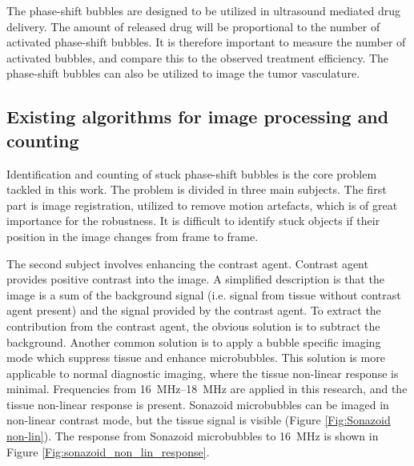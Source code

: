 The phase-shift bubbles are designed to be utilized in ultrasound mediated drug delivery. The amount of released drug will be proportional to the number of activated phase-shift bubbles. It is therefore important to measure the number of activated bubbles, and compare this to the observed treatment efficiency. The phase-shift bubbles can also be utilized to image the tumor vasculature.


  

\clearpage
\subsection{Existing algorithms for image processing and counting}
\label{existing algorithms}
Identification and counting of stuck phase-shift bubbles is the core problem tackled in this work. The problem is divided in three main subjects. The first part is image registration, utilized to remove motion artefacts, which is of great importance for the robustness. It is difficult to identify stuck objects if their position in the image changes from frame to frame.

The second subject involves enhancing the contrast agent. Contrast agent provides positive contrast into the image. A simplified description is that the image is a sum of the background signal (i.e. signal from tissue without contrast agent present) and the signal provided by the contrast agent. To extract the contribution from the contrast agent, the obvious solution is to subtract the background. Another common solution is to apply a bubble specific imaging mode which suppress tissue and enhance microbubbles. This solution is more applicable to normal diagnostic imaging, where the tissue non-linear response is minimal. Frequencies from \SIrange{16}{18}{\mega\hertz} are applied in this research, and the tissue non-linear response is present. Sonazoid\texttrademark{} microbubbles can be imaged in non-linear contrast mode, but the tissue signal is visible (Figure \ref{Fig:Sonazoid non-lin}). The response from Sonazoid\texttrademark{} microbubbles to \SI{16}{\mega\hertz} is shown in Figure \ref{Fig:sonazoid_non_lin_response}.

